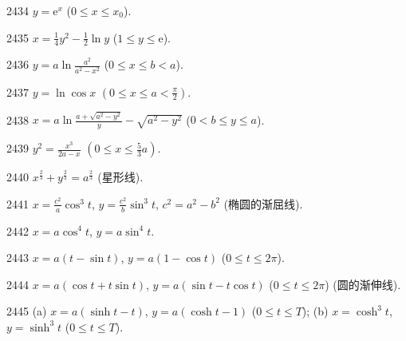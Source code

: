 \begin{prob}[S]{2434}
$y = \mathrm{e}^x$ ($0 \leqslant x \leqslant x_0$).
\end{prob}

\begin{prob}[S]{2435}
$x = \frac{1}{4}y^2 - \frac{1}{2}\ln y$ ($1 \leqslant y \leqslant \mathrm{e}$).
\end{prob}

\begin{prob}[S]{2436}
$y = a\ln\frac{a^2}{a^2 - x^2}$ ($0 \leqslant x \leqslant b < a$).
\end{prob}

\begin{prob}[S]{2437}
$y = \ln\cos x$ $\left(0 \leqslant x \leqslant a < \frac{\pi}{2}\right)$.
\end{prob}

\begin{prob}[S]{2438}
$x = a\ln\frac{a + \sqrt{a^2 - y^2}}{y} - \sqrt{a^2 - y^2}$ ($0 < b \leqslant y \leqslant a$).
\end{prob}

\begin{prob}[S]{2439}
$y^2 = \frac{x^3}{2a - x}$ $\left(0 \leqslant x \leqslant \frac{5}{3}a\right)$.
\end{prob}

\begin{prob}[S]{2440}
$x^{\frac{2}{3}} + y^{\frac{2}{3}} = a^{\frac{2}{3}}$ (星形线).
\end{prob}

\begin{prob}[S]{2441}
$x = \frac{c^2}{a}\cos^3 t$, $y = \frac{c^2}{b}\sin^3 t$, $c^2 = a^2 - b^2$ (椭圆的渐屈线).
\end{prob}

\begin{prob}[S]{2442}
$x = a\cos^4 t$, $y = a\sin^4 t$.
\end{prob}

\begin{prob}[S]{2443}
$x = a(t - \sin t)$, $y = a(1 - \cos t)$ ($0 \leqslant t \leqslant 2\pi$).
\end{prob}

\begin{prob}[S]{2444}
$x = a(\cos t + t\sin t)$, $y = a(\sin t - t\cos t)$ ($0 \leqslant t \leqslant 2\pi$) (圆的渐伸线).
\end{prob}

\begin{prob}[M]{2445}
(a) $x = a(\sinh t - t)$, $y = a(\cosh t - 1)$ ($0 \leqslant t \leqslant T$); \qquad (b) $x = \cosh^3 t$, $y = \sinh^3 t$ ($0 \leqslant t \leqslant T$).
\end{prob}

